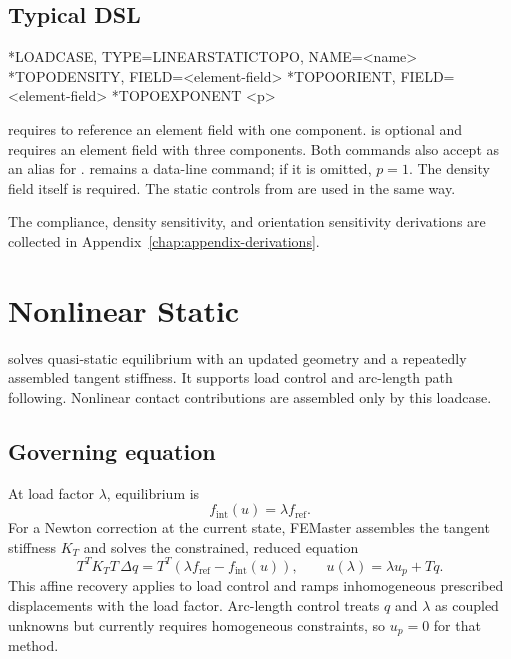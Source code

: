 \subsection{Typical DSL}

\begin{syntax}
*LOADCASE, TYPE=LINEARSTATICTOPO, NAME=<name>
  *TOPODENSITY, FIELD=<element-field>
  *TOPOORIENT, FIELD=<element-field>
  *TOPOEXPONENT
  <p>
\end{syntax}

 requires  to reference an element field with one component.  is optional and requires an element field with three components. Both commands also accept  as an alias for .  remains a data-line command; if it is omitted, \(p=1\). The density field itself is required. The static controls from  are used in the same way.

The compliance, density sensitivity, and orientation sensitivity derivations are collected in Appendix~\ref{chap:appendix-derivations}.

\section{Nonlinear Static}
\label{sec:loadcase-nonlinear-static}

 solves quasi-static equilibrium with an updated geometry and a repeatedly assembled tangent stiffness. It supports load control and arc-length path following. Nonlinear contact contributions are assembled only by this loadcase.

\subsection{Governing equation}

At load factor \(\lambda\), equilibrium is
\[
f_\mathrm{int}(u)=\lambda f_\mathrm{ref}.
\]
For a Newton correction at the current state, FEMaster assembles the tangent stiffness \(K_T\) and solves the constrained, reduced equation
\[
T^T K_T T\,\Delta q
=
T^T\!\left(\lambda f_\mathrm{ref}-f_\mathrm{int}(u)\right),
\qquad
u(\lambda)=\lambda u_p+Tq.
\]
This affine recovery applies to load control and ramps inhomogeneous prescribed displacements with the load factor. Arc-length control treats \(q\) and \(\lambda\) as coupled unknowns but currently requires homogeneous constraints, so \(u_p=0\) for that method.

